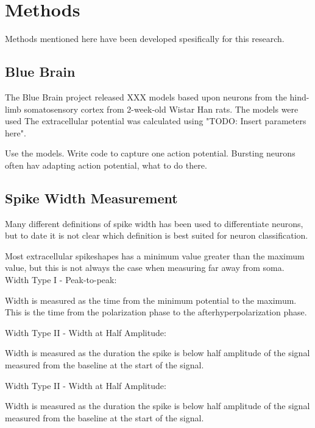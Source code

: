 \documentclass[altfont, fleqn]{uiophd}
\begin{document}
\chapter{Methods}
Methods mentioned here have been developed spesifically for this research. 
\vspace{1em} 
\startcontents
{}
\section{Blue Brain}
The Blue Brain project released XXX models based upon neurons from 
the hind-limb somatosensory cortex
from 2-week-old Wistar Han rats.
The models were used
The extracellular potential was calculated using 
"TODO: Insert parameters here". 

Use the models. Write code to capture one action potential. Bursting neurons
often hav adapting action potential, what to do there. 

\section{Spike Width Measurement}
Many different definitions of spike width has been used to differentiate neurons, but
to date it is not clear which definition is best suited for neuron classification. 

Most extracellular spikeshapes has a minimum value greater than the maximum 
value,
but this is not always the case when measuring
far away from soma. 
\\

\noindent 
Width Type I - Peak-to-peak: 

Width is measured as the time from the minimum potential to the maximum. 
This is the time from the polarization phase to the afterhyperpolarization phase. 
\newline

\noindent
Width Type II - Width at Half Amplitude:

Width is measured as the duration the spike is below half amplitude of the signal measured
from the baseline at the start of the signal. 
\newline

\noindent
Width Type II - Width at Half Amplitude:

Width is measured as the duration the spike is below half amplitude of the signal measured
from the baseline at the start of the signal. 
\newline
\end{document}
